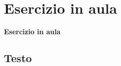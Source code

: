 \documentclass[handout]{beamer}%
\providecommand{\1}{\mathbf{1}}
\begin{document}


\section{Esercizio in aula}%

\begin{frame}%



\vfill


\begin{center}
\textcolor{light-blue}{{\Large \textbf{Esercizio in aula}}}


\end{center}

\vfill
%

\transboxout
\end{frame}%




\subsection{Testo}%
\end{document}
